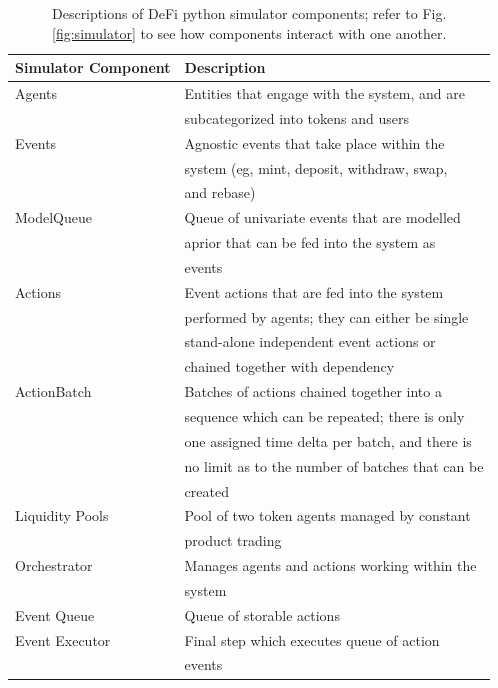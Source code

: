 \documentclass[journal,twocolumn,12pt]{ieeesyscoin}
\begin{document}
\begin{table}[h]
\centering
\begin{tabular}{ |l|l| } 
\hline
 \textbf{Simulator Component} & \textbf{Description} \\
\hline
Agents          & Entities that engage with the system, and are  \\
                & subcategorized into tokens and users \\
Events          & Agnostic events that take place within the \\ 
				& system (eg, mint, deposit, withdraw, swap, \\
				& and rebase) \\
ModelQueue      & Queue of univariate events that are modelled \\
				& aprior that can be fed into the system as \\
				& events\\
Actions         & Event actions that are fed into the system \\
				& performed by agents; they can either be single \\
				& stand-alone independent event actions or \\
				& chained together with dependency \\
ActionBatch     & Batches of actions chained together into a \\
				& sequence which can be repeated; there is only \\
				& one assigned time delta per batch, and there is \\
				& no limit as to the number of batches that can be \\
				& created \\
Liquidity Pools & Pool of two token agents managed by constant \\ 
				& product trading \\
Orchestrator    & Manages agents and actions working within the \\ 
				& system \\
Event Queue     & Queue of storable actions \\
Event Executor  & Final step which executes queue of action \\
				& events \\
\hline
\end{tabular}
\caption{Descriptions of DeFi python simulator components; refer to Fig. \ref{fig:simulator} to see how components interact with one another.}
\label{table:simulator_components}
\end{table}
\end{document}
